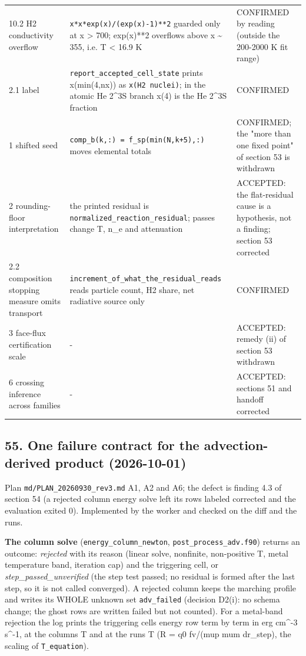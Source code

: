\documentclass[english,a4paper]{my_memo}
\begin{document}
{{\begin{longtable}[]{@{}lll@{}}
10.2 H2 conductivity overflow & \texttt{x*x*exp(x)/(exp(x)-1)**2} guarded only at x \textgreater{} 700; exp(x)**2 overflows above x \textasciitilde{} 355, i.e. T \textless{} 16.9 K & CONFIRMED by reading (outside the 200-2000 K fit range) \\
2.1 label & \texttt{report\_accepted\_cell\_state} prints x(min(4,nx)) as \texttt{x(H2\ nuclei)}; in the atomic He 2\^{}3S branch x(4) is the He 2\^{}3S fraction & CONFIRMED \\
1 shifted seed & \texttt{comp\_b(k,:)\ =\ f\_sp(min(N,k+5),:)} moves elemental totals & CONFIRMED; the "more than one fixed point" of section 53 is withdrawn \\
2 rounding-floor interpretation & the printed residual is \texttt{normalized\_reaction\_residual}; passes change T, n\_e and attenuation & ACCEPTED: the flat-residual cause is a hypothesis, not a finding; section 53 corrected \\
2.2 composition stopping measure omits transport & \texttt{increment\_of\_what\_the\_residual\_reads} reads particle count, H2 share, net radiative source only & CONFIRMED \\
3 face-flux certification scale & - & ACCEPTED: remedy (ii) of section 53 withdrawn \\
6 crossing inference across families & - & ACCEPTED: sections 51 and handoff corrected \\
\end{longtable}
}
}

\subsection{55. One failure contract for the advection-derived product (2026-10-01)}\label{55-one-failure-contract-for-the-advection-derived-product-2026-10-01}

Plan \texttt{md/PLAN\_20260930\_rev3.md} A1, A2 and A6; the defect is finding 4.3 of
section 54 (a rejected column energy solve left its rows labeled corrected
and the evaluation exited 0). Implemented by the worker and checked on the
diff and the runs.

\textbf{The column solve} (\texttt{energy\_column\_newton}, \texttt{post\_process\_adv.f90})
returns an outcome: \emph{rejected} with its reason (linear solve, nonfinite,
non-positive T, metal temperature band, iteration cap) and the triggering
cell, or \emph{step\_passed\_unverified} (the step test passed; no residual is
formed after the last step, so it is not called converged). A rejected
column keeps the marching profile and writes its WHOLE unknown set
\texttt{adv\_failed} (decision D2(i): no schema change; the ghost rows are written
failed but not counted). For a metal-band rejection the log prints the
triggering cell\textquotesingle s energy row term by term in erg cm\^{}-3 s\^{}-1, at the column\textquotesingle s
T and at the run\textquotesingle s T (R = q0 fv/(mup mum dr\_step), the scaling of
\texttt{T\_equation}).
\end{document}
